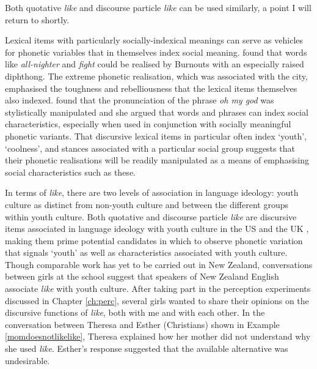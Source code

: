 \noindent  Both quotative \textit{like} and discourse particle \textit{like} can be used similarly, a point I will return to shortly.

Lexical items with particularly socially-indexical meanings can serve as vehicles for phonetic variables that in themselves index social meaning.   found that words like \textit{all-nighter} and \textit{fight} could be realised by Burnouts with an especially raised  diphthong.  The extreme phonetic realisation, which was associated with the city, emphasised the toughness and rebelliousness that the lexical items themselves also indexed.   found that the pronunciation of the phrase \textit{oh my god} was stylistically manipulated and she argued that words and phrases can index social characteristics, especially when used in conjunction with socially meaningful phonetic variants.  That discursive lexical items in particular often index `youth', `coolness', and stances associated with a particular social group suggests that their phonetic realisations will be readily manipulated as a means of emphasising social characteristics such as these.







In terms of \textit{like}, there are two levels of association in language ideology: youth culture as distinct from non-youth culture and between the different groups within youth culture.  Both quotative and discourse particle \textit{like} are discursive items associated in language ideology with youth culture in the US and the UK \cite{daileyocain2000,buchstaller2006}, making them prime potential candidates in which to observe phonetic variation that signals `youth' as well as characteristics associated with youth culture.  Though comparable work has yet to be carried out in New Zealand, conversations between girls at the school suggest that speakers of New Zealand English associate \textit{like} with youth culture.  After taking part in the perception experiments discussed in Chapter \ref{ch:perc}, several girls wanted to share their opinions on the discursive functions of \textit{like}, both with me and with each other.  In the conversation between Theresa and Esther (Christians) shown in Example \ref{momdoesnotlikelike}, Theresa explained how her mother did not understand why she used \textit{like}.  Esther's response suggested that the available alternative was undesirable.



